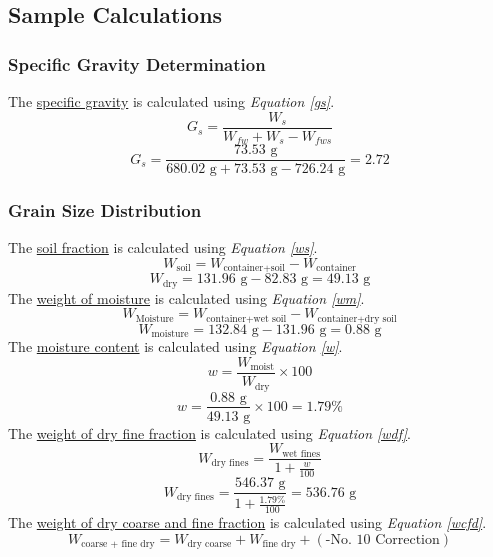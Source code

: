 \documentclass{article}
\begin{document}
\subsection{Sample Calculations}
\subsubsection{Specific Gravity Determination}
\noindent The \underline{specific gravity} is calculated using \emph{Equation \ref{gs}}.
\begin{equation}\label{gs}G_s=\frac{W_s}{W_{fw}+W_s-W_{fws}}\end{equation}
\[G_s=\frac{73.53\text{ g}}{680.02\text{ g}+73.53\text{ g}-726.24\text{ g}}=\boxed{2.72}\]
\subsubsection{Grain Size Distribution}
\noindent The \underline{soil fraction} is calculated using \emph{Equation \ref{ws}}. 
\begin{equation}\label{ws}W_\text{soil}=W_\text{container+soil}-W_\text{container}\end{equation}
\[W_\text{dry}=131.96\text{ g}-82.83\text{ g}=\boxed{49.13\text{ g}}\]
\noindent The \underline{weight of moisture} is calculated using \emph{Equation \ref{wm}}. 
\begin{equation}\label{wm}W_\text{Moisture}=W_\text{container+wet soil}-W_\text{container+dry soil}\end{equation} 
\[W_\text{moisture}=132.84\text{ g}-131.96\text{ g}=\boxed{0.88\text{ g}}\] 
\noindent The \underline{moisture content} is calculated using \emph{Equation \ref{w}}. 
\begin{equation}\label{w}w=\frac{W_\text{moist}}{W_\text{dry}}\times 100\end{equation} 
\[w=\frac{0.88\text{ g}}{49.13\text{ g}}\times 100=\boxed{1.79\%}\] 
\noindent The \underline{weight of dry fine fraction} is calculated using \emph{Equation \ref{wdf}}. 
\begin{equation}\label{wdf}W_\text{dry fines}=\frac{W_\text{wet fines}}{1+\frac{w}{100}}\end{equation} 
\[W_\text{dry fines}=\frac{546.37\text{ g}}{1+\frac{1.79\%}{100}}=\boxed{536.76\text{ g}}\] 
\noindent The \underline{weight of dry coarse and fine fraction} is calculated using \emph{Equation \ref{wcfd}}.
\begin{equation}\label{wcfd}W_\text{coarse + fine dry}=W_\text{dry coarse}+W_\text{fine dry}+(\text{-No. 10 Correction})\end{equation} 
\end{document}
